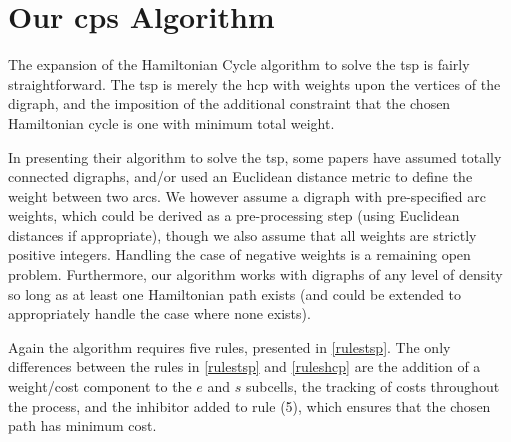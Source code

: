 \section{\label{sect:algotsp}Our \texorpdfstring{\gls{cps}}{cP systems} \texorpdfstring{}{Travelling Salesman Problem} Algorithm}

The expansion of the Hamiltonian Cycle algorithm to solve the \gls{tsp} is fairly straightforward.  The \gls{tsp} is merely the \gls{hcp} with weights upon the vertices of the digraph, and the imposition of the additional constraint that the chosen Hamiltonian cycle is one with minimum total weight.  

In presenting their algorithm to solve the \gls{tsp}, some papers have assumed totally connected digraphs, and/or used an Euclidean distance metric to define the weight between two arcs.  We however assume a digraph with pre-specified arc weights, which could be derived as a pre-processing step (using Euclidean distances if appropriate), though we also assume that all weights are strictly positive integers.  Handling the case of negative weights is a remaining open problem.  Furthermore, our algorithm works with digraphs of any level of density so long as at least one Hamiltonian path exists (and could be extended to appropriately handle the case where none exists).

Again the algorithm requires five rules, presented in \autoref{rulestsp}.  The only differences between the rules in \autoref{rulestsp} and \autoref{ruleshcp} are the addition of a weight/cost component to the \(e\) and \(s\) subcells, the tracking of costs throughout the process, and the inhibitor added to rule (5), which ensures that the chosen path has minimum cost.



